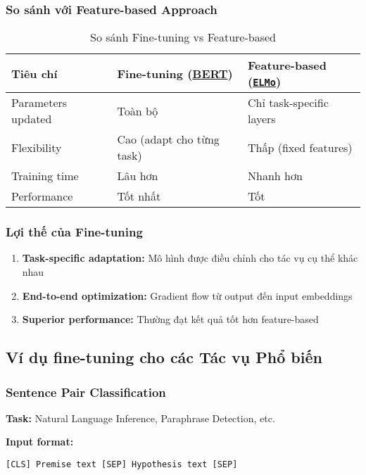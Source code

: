\subsubsection{So sánh với Feature-based Approach}
\begin{table}[H]
\centering
\caption{So sánh Fine-tuning vs Feature-based}
\begin{tabular}{lll}
\toprule
\textbf{Tiêu chí} & \textbf{Fine-tuning (\hyperref[acro:bert]{\textbf{BERT}})} & \textbf{Feature-based (\hyperref[acro:elmo]{\texttt{ELMo}})} \\
\midrule
Parameters updated & Toàn bộ & Chỉ task-specific layers \\
Flexibility & Cao (adapt cho từng task) & Thấp (fixed features) \\
Training time & Lâu hơn & Nhanh
hơn \\
Performance & Tốt nhất & Tốt \\
\bottomrule
\end{tabular}
\end{table}

\subsubsection{Lợi thế của Fine-tuning}
\begin{enumerate}
    \item \textbf{Task-specific adaptation:} Mô hình được điều chỉnh cho tác vụ cụ thể khác nhau
    \item \textbf{End-to-end optimization:} Gradient flow từ output đến input embeddings
    \item \textbf{Superior performance:} Thường đạt kết quả tốt hơn feature-based
\end{enumerate}

\subsection{Ví dụ fine-tuning cho các Tác vụ Phổ biến}
\label{ssec:vi_du_tinh_chinh}

\subsubsection{Sentence Pair Classification}
\textbf{Task:} Natural Language Inference, Paraphrase Detection, etc.

\textbf{Input format:}
\begin{verbatim}
[CLS] Premise text [SEP] Hypothesis text [SEP]
\end{verbatim}

